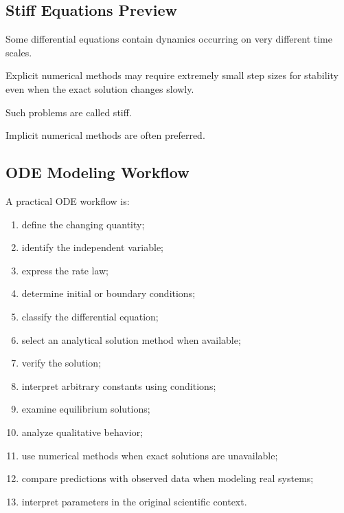 \subsection{Stiff Equations Preview}
\label{subsec:stiff-equations-preview}

Some differential equations contain dynamics occurring on very different
time scales.

Explicit numerical methods may require extremely small step sizes for
stability even when the exact solution changes slowly.

Such problems are called stiff.

Implicit numerical methods are often preferred.

\subsection{ODE Modeling Workflow}
\label{subsec:ode-modeling-workflow}

A practical ODE workflow is:

\begin{enumerate}
    \item define the changing quantity;
    \item identify the independent variable;
    \item express the rate law;
    \item determine initial or boundary conditions;
    \item classify the differential equation;
    \item select an analytical solution method when available;
    \item verify the solution;
    \item interpret arbitrary constants using conditions;
    \item examine equilibrium solutions;
    \item analyze qualitative behavior;
    \item use numerical methods when exact solutions are unavailable;
    \item compare predictions with observed data when modeling real
          systems;
    \item interpret parameters in the original scientific context.
\end{enumerate}

